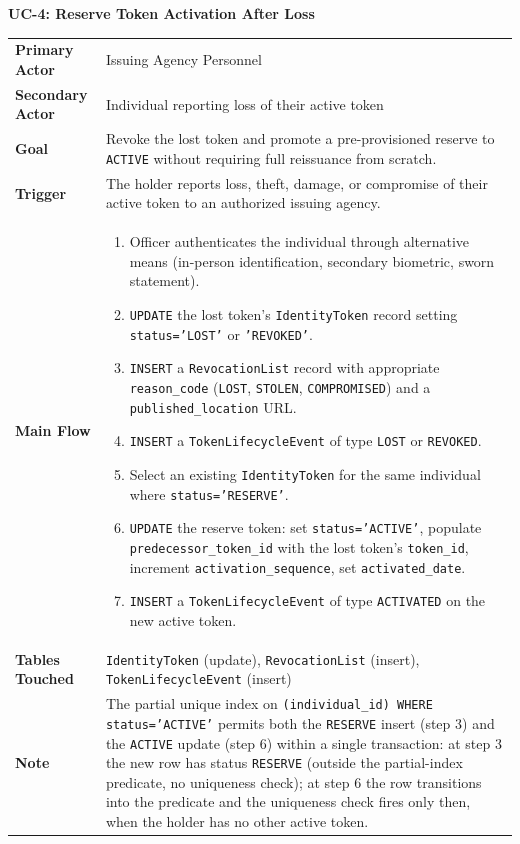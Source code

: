 \documentclass[11pt,letterpaper]{article}
\newcommand{\entity}[1]{\texttt{\color{navydark}#1}}
\newcommand{\usecase}[2]{%
  \needspace{3\baselineskip}%
  \vspace{6pt}%
  \noindent\colorbox{tabheader}{\parbox{\dimexpr\textwidth-2\fboxsep}{%
    \color{white}\small\bfseries\textsc{#1:} \mdseries #2}}%
  \nopagebreak[4]%
  \vspace{2pt}%
  \nopagebreak[4]%
}
\begin{document}
\usecase{UC-4}{Reserve Token Activation After Loss}
\noindent\begin{xltabular}{\textwidth}{>{\bfseries}p{1.4in} >{\RaggedRight\arraybackslash}X}
Primary Actor & Issuing Agency Personnel \\
Secondary Actor & Individual reporting loss of their active token \\
Goal & Revoke the lost token and promote a pre-provisioned reserve to \texttt{ACTIVE} without requiring full reissuance from scratch. \\
Trigger & The holder reports loss, theft, damage, or compromise of their active token to an authorized issuing agency. \\
Main Flow &
\begin{enumerate}
  \item Officer authenticates the individual through alternative means (in-person identification, secondary biometric, sworn statement).
  \item \texttt{UPDATE} the lost token's \entity{IdentityToken} record setting \texttt{status='LOST'} or \texttt{'REVOKED'}.
  \item \texttt{INSERT} a \entity{RevocationList} record with appropriate \texttt{reason\_code} (\texttt{LOST}, \texttt{STOLEN}, \texttt{COMPROMISED}) and a \texttt{published\_location} URL.
  \item \texttt{INSERT} a \entity{TokenLifecycleEvent} of type \texttt{LOST} or \texttt{REVOKED}.
  \item Select an existing \entity{IdentityToken} for the same individual where \texttt{status='RESERVE'}.
  \item \texttt{UPDATE} the reserve token: set \texttt{status='ACTIVE'}, populate \texttt{predecessor\_token\_id} with the lost token's \texttt{token\_id}, increment \texttt{activation\_sequence}, set \texttt{activated\_date}.
  \item \texttt{INSERT} a \entity{TokenLifecycleEvent} of type \texttt{ACTIVATED} on the new active token.
\end{enumerate} \\
Tables Touched & \entity{IdentityToken} (update), \entity{RevocationList} (insert), \entity{TokenLifecycleEvent} (insert) \\
Note & The partial unique index on \texttt{(individual\_id) WHERE status='ACTIVE'} permits both the \texttt{RESERVE} insert (step 3) and the \texttt{ACTIVE} update (step 6) within a single transaction: at step 3 the new row has status \texttt{RESERVE} (outside the partial-index predicate, no uniqueness check); at step 6 the row transitions into the predicate and the uniqueness check fires only then, when the holder has no other active token. \\
\end{xltabular}
\end{document}
